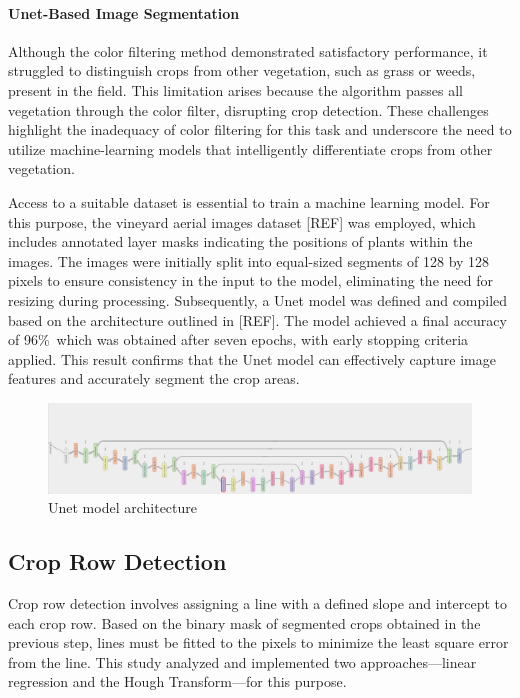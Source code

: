 \documentclass[conference]{IEEEtran}
\begin{document}
\paragraph{Unet-Based Image Segmentation}
Although the color filtering method demonstrated satisfactory performance, it struggled to distinguish crops from other vegetation, such as grass or weeds, present in the field. This limitation arises because the algorithm passes all vegetation through the color filter, disrupting crop detection. These challenges highlight the inadequacy of color filtering for this task and underscore the need to utilize machine-learning models that intelligently differentiate crops from other vegetation.

Access to a suitable dataset is essential to train a machine learning model. For this purpose, the vineyard aerial images dataset [REF] was employed, which includes annotated layer masks indicating the positions of plants within the images. The images were initially split into equal-sized segments of 128 by 128 pixels to ensure consistency in the input to the model, eliminating the need for resizing during processing. Subsequently, a Unet model was defined and compiled based on the architecture outlined in [REF]. The model achieved a final accuracy of 96\%\, which was obtained after seven epochs, with early stopping criteria applied. This result confirms that the Unet model can effectively capture image features and accurately segment the crop areas.

\begin{figure}[htbp]
\includegraphics[width=\linewidth]{UNET.png}
\caption{Unet model architecture}
\label{fig3}
\end{figure}

\subsection{Crop Row Detection}
Crop row detection involves assigning a line with a defined slope and intercept to each crop row. Based on the binary mask of segmented crops obtained in the previous step, lines must be fitted to the pixels to minimize the least square error from the line. This study analyzed and implemented two approaches—linear regression and the Hough Transform—for this purpose.
\end{document}
